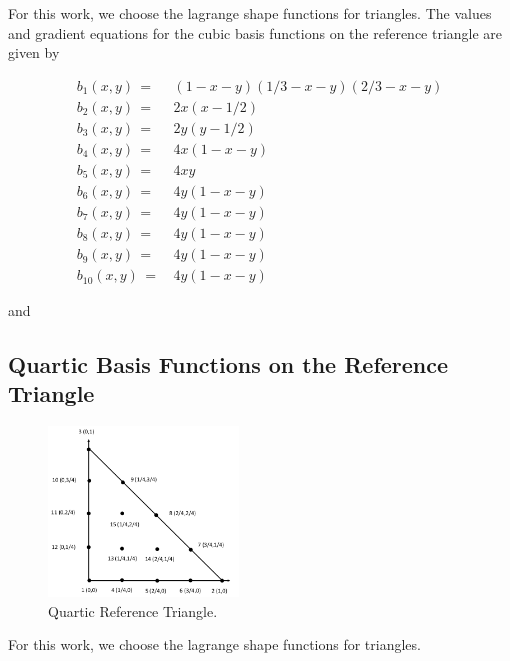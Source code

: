 \documentclass[11pt]{article}
\begin{document}
For this work, we choose the lagrange shape functions for triangles. The values and gradient equations for the cubic basis functions on the reference triangle are given by

\begin{equation}
\label{eq::reftri_cubic_basis_vals}
\begin{aligned}
b_1(x,y) \, =& \, (1-x-y) (1/3-x-y) (2/3-x-y)\\
b_2(x,y) \, =& \, 2x(x-1/2) \\
b_3(x,y) \, =& \, 2y(y-1/2) \\
b_4(x,y) \, =& \, 4x (1-x-y) \\
b_5(x,y) \, =& \, 4xy\\
b_6(x,y) \, =& \, 4y (1-x-y) \\
b_7(x,y) \, =& \, 4y (1-x-y) \\
b_8(x,y) \, =& \, 4y (1-x-y) \\
b_9(x,y) \, =& \, 4y (1-x-y) \\
b_{10}(x,y) \, =& \, 4y (1-x-y) 
\end{aligned}
\end{equation}

\noindent and



\subsection{Quartic Basis Functions on the Reference Triangle}
\label{sec::triref_quartic}

\begin{figure}[hbt]
\centering
\includegraphics[width=0.45\textwidth]{./Figures/ref_triangle_quartic.png}
\caption{Quartic Reference Triangle.}
\hspace{0.5cm}
\label{fig::ref_triangle_quartic}
\end{figure}

For this work, we choose the lagrange shape functions for triangles.
\end{document}
